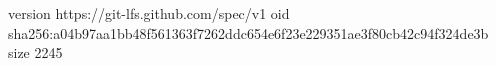 version https://git-lfs.github.com/spec/v1
oid sha256:a04b97aa1bb48f561363f7262ddc654e6f23e229351ae3f80cb42c94f324de3b
size 2245

